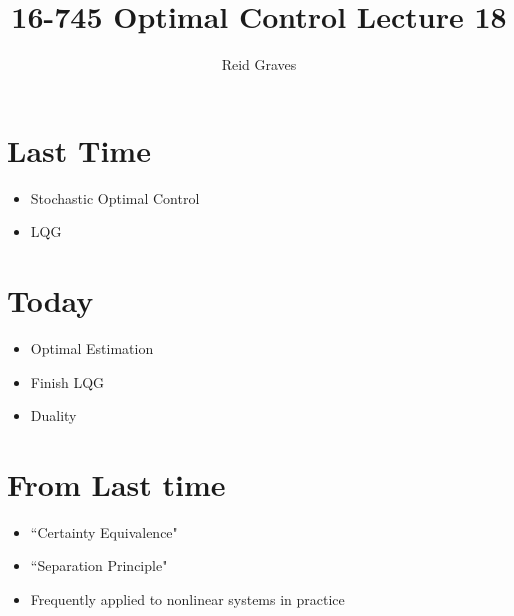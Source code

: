 \documentclass[11pt]{article}
\title{16-745 Optimal Control Lecture 18}
\author{Reid Graves}
\begin{document}
\maketitle

\section*{Last Time}
\begin{itemize}
    \item Stochastic Optimal Control
    \item LQG
\end{itemize}

\section*{Today}
\begin{itemize}
    \item  Optimal Estimation
    \item Finish LQG
    \item Duality
\end{itemize}

\section{From Last time}
\begin{itemize}
    \item ``Certainty Equivalence"
    \item ``Separation Principle"
    \item Frequently applied to nonlinear systems in practice
\end{itemize}
\end{document}
